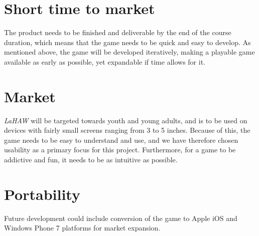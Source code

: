 	\section{Short time to market}
	\label{sec:sttm}
	The product needs to be finished and deliverable by the end of the course duration, which means that the game needs to be quick and easy to develop. As mentioned above, the game will be developed iteratively, making a playable game available as early as possible, yet expandable if time allows for it.

	\section{Market}
	\emph{LaHAW} will be targeted towards youth and young adults, and is to be used on devices with fairly small screens ranging from 3 to 5 inches. Because of this, the game needs to be easy to understand and use, and we have therefore chosen usability as a primary focus for this project. Furthermore, for a game to be addictive and fun, it needs to be as intuitive as possible.

	\section{Portability}
	Future development could include conversion of the game to Apple iOS and Windows Phone 7 platforms for market expansion.